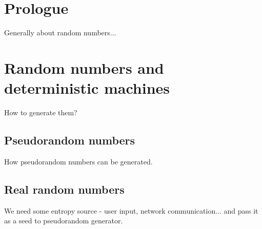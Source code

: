 \chapter{Prologue}
Generally about random numbers... 

\chapter{Random numbers and deterministic machines}
How to generate them?
\section{Pseudorandom numbers}
How pseudorandom numbers can be generated.

\section{Real random numbers}
We need some entropy source - user input, network communication... and pass it as a seed to pseudorandom generator.
